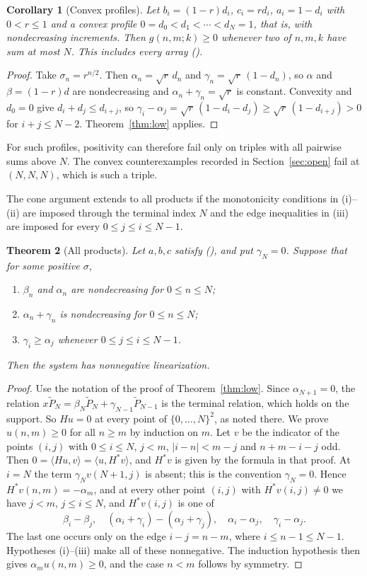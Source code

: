 \documentclass[twoside,10pt]{article}
\numberwithin{equation}{section}
\theoremstyle{slbody}
\newtheorem{theorem}{Theorem}[section]
\newtheorem{corollary}[theorem]{Corollary}
\theoremstyle{definition}
\theoremstyle{remark}
\renewcommand{\eqref}[1]{\textup{{\normalfont(\oldstylenums{\ref{#1}}}\normalfont)}}
\begin{document}
\begin{corollary}[Convex profiles]\label{cor:convex-low}
Let $b_i=(1-r)d_i$, $c_i=rd_i$, $a_i=1-d_i$ with $0<r\leq1$ and a convex profile $0=d_0<d_1<\cdots<d_N=1$, that is, with nondecreasing increments. Then $g(n,m;k)\geq0$ whenever two of $n,m,k$ have sum at most $N$. This includes every array \eqref{eq:parameters}.
\end{corollary}
\begin{proof}
Take $\sigma_n=r^{n/2}$. Then $\alpha_n=\sqrt r\,d_n$ and $\gamma_n=\sqrt r\,(1-d_n)$, so $\alpha$ and $\beta=(1-r)d$ are nondecreasing and $\alpha_n+\gamma_n=\sqrt r$ is constant. Convexity and $d_0=0$ give $d_i+d_j\leq d_{i+j}$, so $\gamma_i-\alpha_j=\sqrt r\,(1-d_i-d_j)\geq\sqrt r\,(1-d_{i+j})>0$ for $i+j\leq N-2$. Theorem~\ref{thm:low} applies.
\end{proof}

For such profiles, positivity can therefore fail only on triples with all pairwise sums above $N$. The convex counterexamples recorded in Section~\ref{sec:open} fail at $(N,N,N)$, which is such a triple.

The cone argument extends to all products if the monotonicity conditions in (i)--(ii) are imposed through the terminal index $N$ and the edge inequalities in (iii) are imposed for every $0\leq j\leq i\leq N-1$.

\begin{theorem}[All products]\label{thm:all}
Let $a,b,c$ satisfy \eqref{eq:basic}, and put $\gamma_N=0$. Suppose that for some positive $\sigma$,
\begin{enumerate}
\item $\beta_n$ and $\alpha_n$ are nondecreasing for $0\leq n\leq N$;
\item $\alpha_n+\gamma_n$ is nondecreasing for $0\leq n\leq N$;
\item $\gamma_i\geq\alpha_j$ whenever $0\leq j\leq i\leq N-1$.
\end{enumerate}
Then the system has nonnegative linearization.
\end{theorem}
\begin{proof}
Use the notation of the proof of Theorem~\ref{thm:low}. Since $\alpha_{N+1}=0$, the relation $x\widetilde P_N=\beta_N\widetilde P_N+\gamma_{N-1}\widetilde P_{N-1}$ is the terminal relation, which holds on the support. So $Hu=0$ at every point of $\{0,\ldots,N\}^2$, as noted there. We prove $u(n,m)\geq0$ for all $n\geq m$ by induction on $m$. Let $v$ be the indicator of the points $(i,j)$ with $0\leq i\leq N$, $j<m$, $|i-n|<m-j$ and $n+m-i-j$ odd. Then $0=\langle Hu,v\rangle=\langle u,H^*v\rangle$, and $H^*v$ is given by the formula in that proof. At $i=N$ the term $\gamma_Nv(N+1,j)$ is absent; this is the convention $\gamma_N=0$. Hence $H^*v(n,m)=-\alpha_m$, and at every other point $(i,j)$ with $H^*v(i,j)\neq0$ we have $j<m$, $j\leq i\leq N$, and $H^*v(i,j)$ is one of
\[
\beta_i-\beta_j,\quad (\alpha_i+\gamma_i)-(\alpha_j+\gamma_j),\quad \alpha_i-\alpha_j,\quad \gamma_i-\alpha_j.
\]
The last one occurs only on the edge $i-j=n-m$, where $i\leq n-1\leq N-1$. Hypotheses (i)--(iii) make all of these nonnegative. The induction hypothesis then gives $\alpha_mu(n,m)\geq0$, and the case $n<m$ follows by symmetry.
\end{proof}
\end{document}
